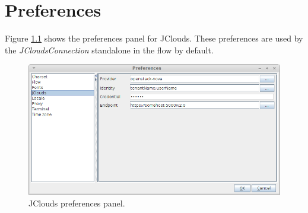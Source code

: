 \documentclass[a4paper]{book}
\begin{document}
\chapter{Preferences}

Figure \ref{preferences} shows the preferences panel for JClouds. These
preferences are used by the \textit{JCloudsConnection} standalone in the
flow by default.

\begin{figure}[htb]
  \centering
  \includegraphics[width=12.0cm]{images/preferences.png}
  \caption{JClouds preferences panel.}
  \label{preferences}
\end{figure}


\end{document}
